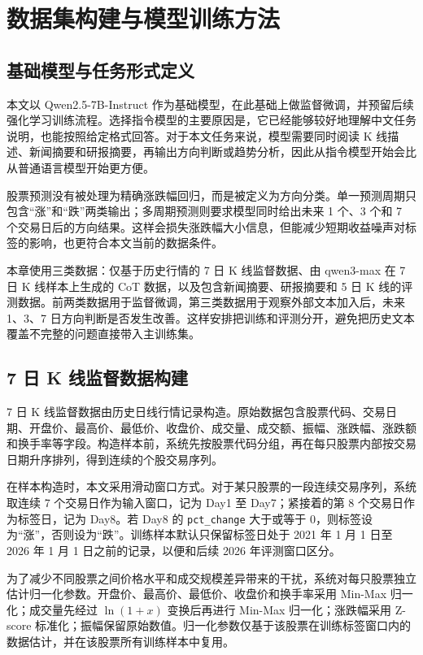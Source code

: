 
\chapter{数据集构建与模型训练方法}

\section{基础模型与任务形式定义}

本文以 Qwen2.5-7B-Instruct 作为基础模型，在此基础上做监督微调，并预留后续强化学习训练流程。选择指令模型的主要原因是，它已经能够较好地理解中文任务说明，也能按照给定格式回答。对于本文任务来说，模型需要同时阅读 K 线描述、新闻摘要和研报摘要，再输出方向判断或趋势分析，因此从指令模型开始会比从普通语言模型开始更方便。

股票预测没有被处理为精确涨跌幅回归，而是被定义为方向分类。单一预测周期只包含“涨”和“跌”两类输出；多周期预测则要求模型同时给出未来 1 个、3 个和 7 个交易日后的方向结果。这样会损失涨跌幅大小信息，但能减少短期收益噪声对标签的影响，也更符合本文当前的数据条件。

本章使用三类数据：仅基于历史行情的 7 日 K 线监督数据、由 qwen3-max 在 7 日 K 线样本上生成的 CoT 数据，以及包含新闻摘要、研报摘要和 5 日 K 线的评测数据。前两类数据用于监督微调，第三类数据用于观察外部文本加入后，未来 1、3、7 日方向判断是否发生改善。这样安排把训练和评测分开，避免把历史文本覆盖不完整的问题直接带入主训练集。

\section{7 日 K 线监督数据构建}

7 日 K 线监督数据由历史日线行情记录构造。原始数据包含股票代码、交易日期、开盘价、最高价、最低价、收盘价、成交量、成交额、振幅、涨跌幅、涨跌额和换手率等字段。构造样本前，系统先按股票代码分组，再在每只股票内部按交易日期升序排列，得到连续的个股交易序列。

在样本构造时，本文采用滑动窗口方式。对于某只股票的一段连续交易序列，系统取连续 7 个交易日作为输入窗口，记为 Day1 至 Day7；紧接着的第 8 个交易日作为标签日，记为 Day8。若 Day8 的 \texttt{pct\_change} 大于或等于 0，则标签设为“涨”，否则设为“跌”。训练样本默认只保留标签日处于 2021 年 1 月 1 日至 2026 年 1 月 1 日之前的记录，以便和后续 2026 年评测窗口区分。

为了减少不同股票之间价格水平和成交规模差异带来的干扰，系统对每只股票独立估计归一化参数。开盘价、最高价、最低价、收盘价和换手率采用 Min-Max 归一化；成交量先经过 \(\ln(1+x)\) 变换后再进行 Min-Max 归一化；涨跌幅采用 Z-score 标准化；振幅保留原始数值。归一化参数仅基于该股票在训练标签窗口内的数据估计，并在该股票所有训练样本中复用。

